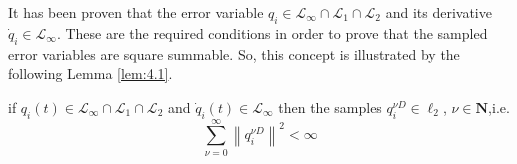     It has been proven that the error variable $q_i \in \mathcal{L}_{\infty}\cap\mathcal{L}_1\cap\mathcal{L}_2$ and its derivative $\dot{q}_i \in \mathcal{L}_{\infty}$. These are the required conditions in order to prove that the sampled error variables are square summable. So, this concept is illustrated by the following Lemma \ref{lem:4.1}.
    
    \begin{lemma}\label{lem:4.1}
        if $q_i(t) \in \mathcal{L}_{\infty} \cap \mathcal{L}_1 \cap \mathcal{L}_2$ and $\dot{q}_i(t) \in \mathcal{L}_{\infty}$ then the samples $q_i^{\nu D} \in \mathcal{\ell}_2$, $\nu \in \mathbf{N}$,i.e.
        \begin{equation}\label{eq:4.2.14}
            \sum_{\nu = 0}^{\infty} \left \lVert q_i^{\nu D} \right \rVert^2 < \infty
        \end{equation}
    \end{lemma}
    
